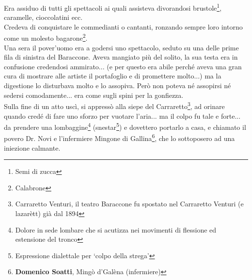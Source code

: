Era assiduo di tutti gli spettacoli ai quali assisteva divorandosi brustole\footnote{Semi di zucca}, caramelle, cioccolatini ecc.\\
\indent Credeva di conquistare le commedianti o cantanti, ronzando sempre loro intorno come un molesto bagarone\footnote{Calabrone}.\\
\indent Una sera il pover'uomo era a godersi uno spettacolo, seduto su una delle prime fila di sinistra del Baraccone. Aveva mangiato più del solito, la sua testa era in confusione credendosi ammirato... (e per questo era abile perché aveva una gran cura di mostrare alle artiste il portafoglio e di promettere molto...) ma la digestione lo disturbava molto e lo assopiva. Però non poteva né assopirsi né sedersi comodamente... era come sugli spini per la gonfiezza.\\
\indent Sulla fine di un atto uscì, si appressò alla siepe del Carraretto\footnote{Carraretto Venturi, il teatro Baraccone fu spostato nel Carraretto Venturi (e lazarètt) già dal 1894}, ad orinare quando credé di fare uno sforzo per vuotare l'aria... ma il colpo fu tale e forte... da prendere una lombaggine\footnote{Dolore in sede lombare che si acutizza nei movimenti di flessione ed estensione del tronco} (snestar\footnote{Espressione dialettale per `colpo della strega'}) e dovettero portarlo a casa, e chiamato il povero Dr. Novi e l'infermiere Mingone di Gallina\footnote{\textbf{Domenico Soatti}, Mingò d'Galèna (infermiere)}, che lo sottoposero ad una iniezione calmante.\\

